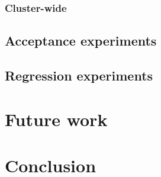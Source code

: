 \subsection{Cluster-wide}


\section{Acceptance experiments}
\section{Regression experiments}

\chapter{Future work}
\label{07:chapter:title}

\chapter{Conclusion}
\label{08:chapter:title}